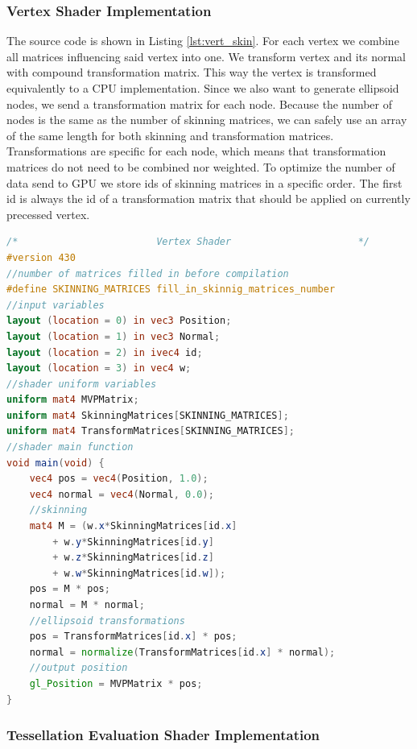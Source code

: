 \subsubsection{Vertex Shader Implementation}

The source code is shown in Listing \ref{lst:vert_skin}.
For each vertex we combine all matrices influencing said vertex into one.
We transform vertex and its normal with compound transformation matrix.
This way the vertex is transformed equivalently to a CPU implementation.
Since we also want to generate ellipsoid nodes, we send a transformation matrix for each node.
Because the number of nodes is the same as the number of skinning matrices, we can safely use an array of the same length for both skinning and transformation matrices.
Transformations are specific for each node, which means that transformation matrices do not need to be combined nor weighted.
To optimize the number of data send to GPU we store ids of skinning matrices in a specific order.
The first id is always the id of a transformation matrix that should be applied on currently precessed vertex.

\linespread{1.2}
\begin{lstlisting}[language=GLSL,caption={Linear Blend Skinning implemented in vertex shader},label={lst:vert_skin}]
/*                        Vertex Shader                      */ 
#version 430
//number of matrices filled in before compilation
#define SKINNING_MATRICES fill_in_skinnig_matrices_number
//input variables
layout (location = 0) in vec3 Position;
layout (location = 1) in vec3 Normal;
layout (location = 2) in ivec4 id;
layout (location = 3) in vec4 w;
//shader uniform variables
uniform mat4 MVPMatrix;
uniform mat4 SkinningMatrices[SKINNING_MATRICES];
uniform mat4 TransformMatrices[SKINNING_MATRICES];
//shader main function
void main(void) {
	vec4 pos = vec4(Position, 1.0);
	vec4 normal = vec4(Normal, 0.0);
	//skinning
	mat4 M = (w.x*SkinningMatrices[id.x]
		+ w.y*SkinningMatrices[id.y] 
		+ w.z*SkinningMatrices[id.z] 
		+ w.w*SkinningMatrices[id.w]);
	pos = M * pos;
	normal = M * normal;
	//ellipsoid transformations
	pos = TransformMatrices[id.x] * pos;
	normal = normalize(TransformMatrices[id.x] * normal);
	//output position
	gl_Position = MVPMatrix * pos;
}
\end{lstlisting} 
\linespread{1.5}

\subsubsection{Tessellation Evaluation Shader Implementation}

